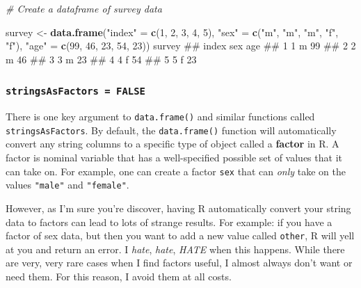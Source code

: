 \documentclass[]{book}
\newenvironment{Shaded}{\begin{snugshade}}{\end{snugshade}}
\newcommand{\KeywordTok}[1]{\textcolor[rgb]{0.13,0.29,0.53}{\textbf{{#1}}}}
\newcommand{\DecValTok}[1]{\textcolor[rgb]{0.00,0.00,0.81}{{#1}}}
\newcommand{\StringTok}[1]{\textcolor[rgb]{0.31,0.60,0.02}{{#1}}}
\newcommand{\CommentTok}[1]{\textcolor[rgb]{0.56,0.35,0.01}{\textit{{#1}}}}
\newcommand{\NormalTok}[1]{{#1}}
\theoremstyle{definition}
\theoremstyle{definition}
\theoremstyle{remark}
\begin{document}
\begin{Shaded}
\begin{Highlighting}[]
\CommentTok{# Create a dataframe of survey data}

\NormalTok{survey <-}\StringTok{ }\KeywordTok{data.frame}\NormalTok{(}\StringTok{"index"} \NormalTok{=}\StringTok{ }\KeywordTok{c}\NormalTok{(}\DecValTok{1}\NormalTok{, }\DecValTok{2}\NormalTok{, }\DecValTok{3}\NormalTok{, }\DecValTok{4}\NormalTok{, }\DecValTok{5}\NormalTok{),}
                     \StringTok{"sex"} \NormalTok{=}\StringTok{ }\KeywordTok{c}\NormalTok{(}\StringTok{"m"}\NormalTok{, }\StringTok{"m"}\NormalTok{, }\StringTok{"m"}\NormalTok{, }\StringTok{"f"}\NormalTok{, }\StringTok{"f"}\NormalTok{),}
                     \StringTok{"age"} \NormalTok{=}\StringTok{ }\KeywordTok{c}\NormalTok{(}\DecValTok{99}\NormalTok{, }\DecValTok{46}\NormalTok{, }\DecValTok{23}\NormalTok{, }\DecValTok{54}\NormalTok{, }\DecValTok{23}\NormalTok{))}
\NormalTok{survey}
\NormalTok{##   index sex age}
\NormalTok{## 1     1   m  99}
\NormalTok{## 2     2   m  46}
\NormalTok{## 3     3   m  23}
\NormalTok{## 4     4   f  54}
\NormalTok{## 5     5   f  23}
\end{Highlighting}
\end{Shaded}

\subsubsection{\texorpdfstring{\texttt{stringsAsFactors\ =\ FALSE}}{stringsAsFactors = FALSE}}\label{stringsasfactors-false}

There is one key argument to \texttt{data.frame()} and similar functions
called \texttt{stringsAsFactors}. By default, the \texttt{data.frame()}
function will automatically convert any string columns to a specific
type of object called a \textbf{factor} in R. A factor is nominal
variable that has a well-specified possible set of values that it can
take on. For example, one can create a factor \texttt{sex} that can
\emph{only} take on the values \texttt{"male"} and \texttt{"female"}.

However, as I'm sure you're discover, having R automatically convert
your string data to factors can lead to lots of strange results. For
example: if you have a factor of sex data, but then you want to add a
new value called \texttt{other}, R will yell at you and return an error.
I \emph{hate}, \emph{hate}, \emph{HATE} when this happens. While there
are very, very rare cases when I find factors useful, I almost always
don't want or need them. For this reason, I avoid them at all costs.
\end{document}
